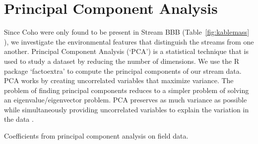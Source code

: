 \section{Principal Component Analysis}



Since Coho were only found to be present in Stream BBB (Table~\ref{fig:kablemass} ), we investigate the environmental features that distinguish the streams from one another. Principal Component Analysis (`PCA') is a statistical technique that is used to study a dataset by reducing the number of dimensions. We use the R package `factoextra' \citep{facto} to compute the principal components of our stream data. PCA works by creating uncorrelated variables that maximize variance. The problem of finding principal components reduces to a simpler problem of solving an eigenvalue/eigenvector problem. PCA preserves as much variance as possible while simultaneously providing uncorrelated variables to explain the variation in the data \citep{PCA}.

\vspace{5mm}

\begin{table}[H]
\begin{singlespace*}

\end{singlespace*}
\caption{\hspace{1mm} Coefficients from principal component analysis on field data.}
\label{fig:pcaloadings}
\end{table}

